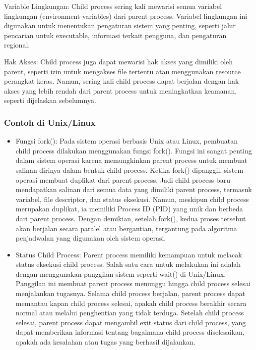 \documentclass[12pt]{article}
\begin{document}
\begin{itemize}
    {Variable Lingkungan:} Child process sering kali mewarisi semua variabel lingkungan (environment variables) dari parent process. Variabel lingkungan ini digunakan untuk menentukan pengaturan sistem yang penting, seperti jalur pencarian untuk executable, informasi terkait pengguna, dan pengaturan regional.
   
    {Hak Akses:} Child process juga dapat mewarisi hak akses yang dimiliki oleh parent, seperti izin untuk mengakses file tertentu atau menggunakan resource perangkat keras. Namun, sering kali child process dapat berjalan dengan hak akses yang lebih rendah dari parent process untuk meningkatkan keamanan, seperti dijelaskan sebelumnya.
\end{itemize}

\subsubsection{Contoh di Unix/Linux}

\begin{itemize}
    \item Fungsi fork(): Pada sistem operasi berbasis Unix atau Linux, pembuatan child process dilakukan menggunakan fungsi fork(). Fungsi ini sangat penting dalam sistem operasi karena memungkinkan parent process untuk membuat salinan dirinya dalam bentuk child process. Ketika fork() dipanggil, sistem operasi membuat duplikat dari parent process, Jadi child process baru mendapatkan salinan dari semua data yang dimiliki parent process, termasuk variabel, file descriptor, dan status eksekusi. Namun, meskipun child process merupakan duplikat, ia memiliki Process ID (PID) yang unik dan berbeda dari parent process. Dengan demikian, setelah fork(), kedua proses tersebut akan berjalan secara paralel atau bergantian, tergantung pada algoritma penjadwalan yang digunakan oleh sistem operasi.
    
    \item Status Child Process: Parent process memiliki kemampuan untuk melacak status eksekusi child process. Salah satu cara untuk melakukan ini adalah dengan menggunakan panggilan sistem seperti wait() di Unix/Linux. Panggilan ini membuat parent process menunggu hingga child process selesai menjalankan tugasnya. Selama child process berjalan, parent process dapat memantau kapan child process selesai, apakah child process berakhir secara normal atau melalui penghentian yang tidak terduga. Setelah child process selesai, parent process dapat mengambil exit status dari child process, yang dapat memberikan informasi tentang bagaimana child process diselesaikan, apakah ada kesalahan atau tugas yang berhasil dijalankan.
\end{itemize}
\end{document}
